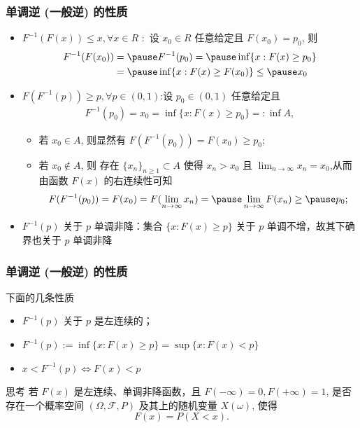 \documentclass[Prob-All.tex]{subfiles}
\begin{document}
 \begin{frame}
	 \frametitle{单调逆 (一般逆) 的性质}

	 \begin{itemize}[<+-|alert@+>]
		 \item $F^{-1}(F (x))\leq x, \forall x\in R$ :\pause\  设 $x_0\in R$ 任意给定且 $F (x_0)=p_0$, 则 \pause
		 \begin{align*}
		  F^{-1}(F(x_0))&=\pause F^{-1}(p_0)=\pause \inf\{x: F(x)\geq p_0\}\\
		  &=\pause \inf\{x: F(x)\geq F(x_0)\}\leq\pause  x_0
		 \end{align*}
		 \item $F (F^{-1}(p))\geq p, \forall p\in (0,1)$:\pause 设 $p_0\in (0,1)$ 任意给定且
		 \begin{align*}
		 F^{-1}(p_0)=x_0=\inf\{x: F(x)\geq p_0\}=:\inf A, %
		 \end{align*}
	 \begin{itemize}[<+-|alert@+>]
		 \item 若 $x_0\in A$, 则显然有 $F (F^{-1}(p_0))=F (x_0)\geq p_0$;
		 \item 若 $x_0\notin A$, 则 \pause 存在 $\{x_n\}_{n\geq 1}\subset A$ 使得 $x_n>x_0$ 且 $\lim_{n\rightarrow \infty} x_n=x_0$,\pause  从而由函数 $F (x)$ 的右连续性可知 \pause
		 \[F(F^{-1}(p_0))=F(x_0)=F(\lim_{n\rightarrow \infty}x_n)=\pause \lim_{n\rightarrow \infty}F(x_n)\geq\pause p_0;\]
	 \end{itemize}
	 \item $F^{-1}(p)$ 关于 $p$ 单调非降：集合 $\{x:F (x)\geq p\}$ 关于 $p$ 单调不增，故其下确界也关于 $p$ 单调非降
		 \end{itemize}
	 \end{frame}

 \begin{frame}
	 \frametitle{单调逆 (一般逆) 的性质}
	 下面的几条性质 %
	 \begin{itemize}[<+-|alert@+>]
		 \item  $F^{-1}(p)$ 关于 $p$ 是左连续的；
		 \item $F^{-1}(p):=\inf\{x: F(x)\geq p\}=\sup\{x:F(x)<p\}$
		 \item $x<F^{-1}(p)\Leftrightarrow F(x)<p$
	 \end{itemize}

 \end{frame}

 \begin{frame}{思考}
	 若 $F (x)$ 是左连续、单调非降函数，且 $F (-\infty)=0, F (+\infty)=1$, 是否存在一个概率空间 $(\Omega,\mathcal{F},P)$ 及其上的随机变量 $X (\omega)$, 使得
	 \[F(x)=P(X<x).\]



 \end{frame}
\end{document}
